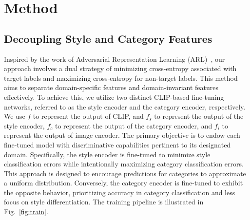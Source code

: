 
\section{Method}


\subsection{Decoupling Style and Category Features}

Inspired by the work of Adversarial Representation Learning (ARL)~\cite{ding2022domain}, our approach involves a dual strategy of minimizing cross-entropy associated with target labels and maximizing cross-entropy for non-target labels. This method aims to separate domain-specific features and domain-invariant features effectively. To achieve this, we utilize two distinct CLIP-based fine-tuning networks, referred to as the style encoder and the category encoder, respectively. We use $f$ to represent the output of CLIP, and $f_{s}$ to represent the output of the style encoder, $f_{c}$ to represent the output of the category encoder, and $f_i$ to represent the output of image encoder. The primary objective is to endow each fine-tuned model with discriminative capabilities pertinent to its designated domain. Specifically, the style encoder is fine-tuned to minimize style classification errors while intentionally maximizing category classification errors. This approach is designed to encourage predictions for categories to approximate a uniform distribution. Conversely, the category encoder is fine-tuned to exhibit the opposite behavior, prioritizing accuracy in category classification and less focus on style differentiation. The training pipeline is illustrated in Fig.~\ref{fig:train}.

